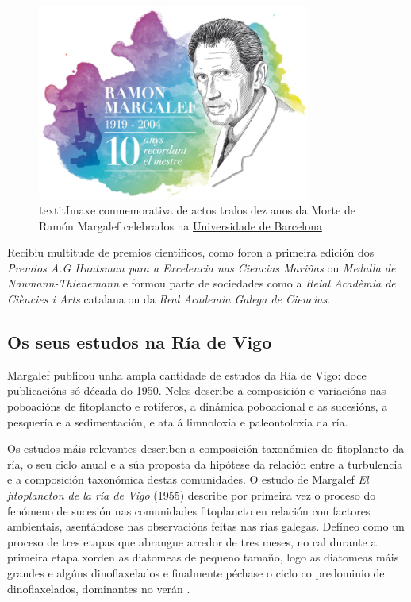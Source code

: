 \documentclass{article}
\begin{document}
\begin{figure}[htp]
    \centering
    \includegraphics[width=0.8\textwidth]{./figure/logomargalef.png}
    \caption*{textit{Imaxe conmemorativa de actos tralos dez anos da Morte de Ramón Margalef celebrados na \href{www.ub.edu}{Universidade de Barcelona}}}
    \label{fig:icm_memoriam}
\end{figure}

Recibiu multitude de premios científicos, como foron a primeira edición dos \textit{Premios A.G Huntsman para a Excelencia nas Ciencias Mariñas} ou \textit{Medalla de Naumann-Thienemann} e formou parte de sociedades como a \textit{Reial Acadèmia de Ciències i Arts} catalana ou da \textit{Real Academia Galega de Ciencias}.

\subsection{Os seus estudos na Ría de Vigo}
Margalef publicou unha ampla cantidade de estudos da Ría de Vigo: doce publicacións só  década do 1950. Neles describe a composición e variacións nas poboacións de fitoplancto e rotíferos, a dinámica poboacional e as sucesións, a pesquería e a sedimentación, e ata á limnoloxía e paleontoloxía da ría. 

Os estudos máis relevantes describen a composición taxonómica do fitoplancto da ría, o seu ciclo anual e a súa proposta da hipótese da relación entre a turbulencia e a composición taxonómica destas comunidades. O estudo de Margalef \textit{El fitoplancton de la ría de Vigo} (1955) describe por primeira vez o proceso do fenómeno de sucesión nas comunidades fitoplancto en relación con factores ambientais, asentándose nas observacións feitas nas rías galegas. Defíneo como un proceso de tres etapas que abrangue arredor de tres meses, no cal durante a primeira etapa xorden as diatomeas de pequeno tamaño, logo as diatomeas máis grandes e algúns dinoflaxelados e finalmente péchase o ciclo co predominio de dinoflaxelados, dominantes no verán \cite{duran1956;margalef1955;nogueira2005}.
\end{document}
